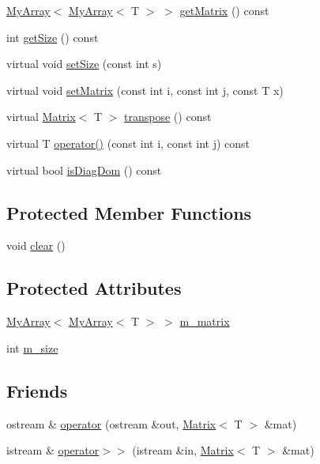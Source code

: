 \begin{DoxyCompactItemize}
\item 
\hyperlink{classMyArray}{My\+Array}$<$ \hyperlink{classMyArray}{My\+Array}$<$ T $>$ $>$ \hyperlink{classMatrix_afba2ee1c4e106b78099350d070ae1e51}{get\+Matrix} () const 
\item 
int \hyperlink{classMatrix_aa5d12d49bec4b4876f1a60c54a197ed7}{get\+Size} () const 
\item 
virtual void \hyperlink{classMatrix_a1add3e066eaaa19d5056fc6e2cbc767c}{set\+Size} (const int s)
\item 
virtual void \hyperlink{classMatrix_a0cf31a462707441cbbab037190c88f33}{set\+Matrix} (const int i, const int j, const T x)
\item 
virtual \hyperlink{classMatrix}{Matrix}$<$ T $>$ \hyperlink{classMatrix_afe686234b6fe54ab2ae7f500777ca560}{transpose} () const 
\item 
virtual T \hyperlink{classMatrix_af786e95d49ae55d42c3bd6824a64e032}{operator()} (const int i, const int j) const 
\item 
virtual bool \hyperlink{classMatrix_ab5deedc9644d1b8c6bc220dd336f0102}{is\+Diag\+Dom} () const 
\end{DoxyCompactItemize}
\subsection*{Protected Member Functions}
\begin{DoxyCompactItemize}
\item 
void \hyperlink{classMatrix_ad39022f082bfee09e24d098796e14e10}{clear} ()
\end{DoxyCompactItemize}
\subsection*{Protected Attributes}
\begin{DoxyCompactItemize}
\item 
\hyperlink{classMyArray}{My\+Array}$<$ \hyperlink{classMyArray}{My\+Array}$<$ T $>$ $>$ \hyperlink{classMatrix_a3190abe45497430b3aa006002af3cb37}{m\+\_\+matrix}
\item 
int \hyperlink{classMatrix_a1113fd527e7677a93e88d1e736450968}{m\+\_\+size}
\end{DoxyCompactItemize}
\subsection*{Friends}
\begin{DoxyCompactItemize}
\item 
ostream \& \hyperlink{classMatrix_a7a26ce88f9d928002eba0af6847a0b44}{operator} (ostream \&out, \hyperlink{classMatrix}{Matrix}$<$ T $>$ \&mat)
\item 
istream \& \hyperlink{classMatrix_a175cb81129f42ab801259469bc7cc7a0}{operator$>$$>$} (istream \&in, \hyperlink{classMatrix}{Matrix}$<$ T $>$ \&mat)
\end{DoxyCompactItemize}


